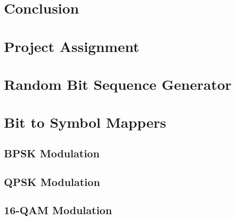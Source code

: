 \documentclass[]{article}
\begin{document}
\section{Conclusion}

\appendix
\newpage
\section{Project Assignment}
\label{app:assign}

\cleardoublepage
\newpage


\section{Random Bit Sequence Generator}
\label{app:random_bit_generator}

\cleardoublepage
\newpage

\section{Bit to Symbol Mappers}
\label{app:bittosym}
\subsection{BPSK Modulation }
\label{app:bpsk_mod}
%


\cleardoublepage  %
\newpage

\subsection{QPSK Modulation}
\label{app:qpsk_mod}

\cleardoublepage  %
\newpage

\subsection{16-QAM Modulation}
\label{app:qam_16_mod}


\cleardoublepage  %
\newpage
\end{document}
